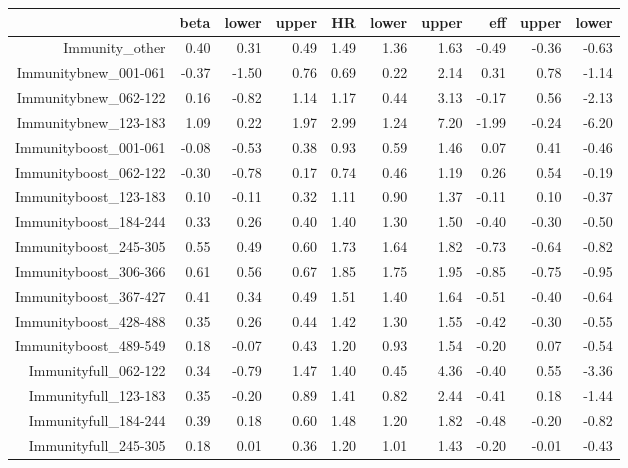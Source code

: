 \begin{table}[ht]
\centering
\begin{tabular}{rrrrrrrrrr}
  \hline
 & beta & lower & upper & HR & lower & upper & eff & upper & lower \\ 
  \hline
Immunity\_other & 0.40 & 0.31 & 0.49 & 1.49 & 1.36 & 1.63 & -0.49 & -0.36 & -0.63 \\ 
  Immunitybnew\_001-061 & -0.37 & -1.50 & 0.76 & 0.69 & 0.22 & 2.14 & 0.31 & 0.78 & -1.14 \\ 
  Immunitybnew\_062-122 & 0.16 & -0.82 & 1.14 & 1.17 & 0.44 & 3.13 & -0.17 & 0.56 & -2.13 \\ 
  Immunitybnew\_123-183 & 1.09 & 0.22 & 1.97 & 2.99 & 1.24 & 7.20 & -1.99 & -0.24 & -6.20 \\ 
  Immunityboost\_001-061 & -0.08 & -0.53 & 0.38 & 0.93 & 0.59 & 1.46 & 0.07 & 0.41 & -0.46 \\ 
  Immunityboost\_062-122 & -0.30 & -0.78 & 0.17 & 0.74 & 0.46 & 1.19 & 0.26 & 0.54 & -0.19 \\ 
  Immunityboost\_123-183 & 0.10 & -0.11 & 0.32 & 1.11 & 0.90 & 1.37 & -0.11 & 0.10 & -0.37 \\ 
  Immunityboost\_184-244 & 0.33 & 0.26 & 0.40 & 1.40 & 1.30 & 1.50 & -0.40 & -0.30 & -0.50 \\ 
  Immunityboost\_245-305 & 0.55 & 0.49 & 0.60 & 1.73 & 1.64 & 1.82 & -0.73 & -0.64 & -0.82 \\ 
  Immunityboost\_306-366 & 0.61 & 0.56 & 0.67 & 1.85 & 1.75 & 1.95 & -0.85 & -0.75 & -0.95 \\ 
  Immunityboost\_367-427 & 0.41 & 0.34 & 0.49 & 1.51 & 1.40 & 1.64 & -0.51 & -0.40 & -0.64 \\ 
  Immunityboost\_428-488 & 0.35 & 0.26 & 0.44 & 1.42 & 1.30 & 1.55 & -0.42 & -0.30 & -0.55 \\ 
  Immunityboost\_489-549 & 0.18 & -0.07 & 0.43 & 1.20 & 0.93 & 1.54 & -0.20 & 0.07 & -0.54 \\ 
  Immunityfull\_062-122 & 0.34 & -0.79 & 1.47 & 1.40 & 0.45 & 4.36 & -0.40 & 0.55 & -3.36 \\ 
  Immunityfull\_123-183 & 0.35 & -0.20 & 0.89 & 1.41 & 0.82 & 2.44 & -0.41 & 0.18 & -1.44 \\ 
  Immunityfull\_184-244 & 0.39 & 0.18 & 0.60 & 1.48 & 1.20 & 1.82 & -0.48 & -0.20 & -0.82 \\ 
  Immunityfull\_245-305 & 0.18 & 0.01 & 0.36 & 1.20 & 1.01 & 1.43 & -0.20 & -0.01 & -0.43 \\ 

\end{tabular}
\end{table}
